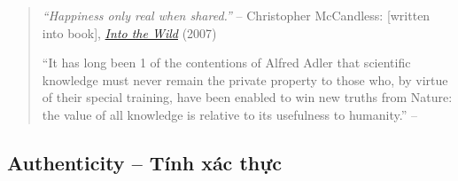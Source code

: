 \documentclass[12pt]{article}
\begin{document}
\begin{quotation}
	{\it``Happiness only real when shared.''} -- {\sc Christopher McCandless}: {\rm[written into book]}, \href{https://www.imdb.com/title/tt0758758}{\it Into the Wild} (2007)
	
	``It has long been 1 of the contentions of {\sc Alfred Adler} that scientific knowledge must never remain the private property to those who, by virtue of their special training, have been enabled to win new truths from Nature: the value of all knowledge is relative to its usefulness to humanity.'' -- \cite[Translator's Preface, p. vii]{Adler_human_nature}
\end{quotation}

\subsection{Authenticity -- Tính xác thực}
\end{document}
